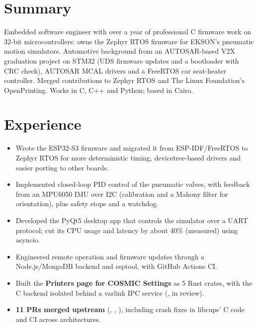 \documentclass[10pt]{article}
\begin{document}

\section*{Summary}
Embedded software engineer with over a year of professional C firmware work on 32-bit microcontrollers: owns the Zephyr RTOS firmware for EKSON's pneumatic motion simulators. Automotive background from an AUTOSAR-based V2X graduation project on STM32 (UDS firmware updates and a bootloader with CRC check), AUTOSAR MCAL drivers and a FreeRTOS car seat-heater controller. Merged contributions to Zephyr RTOS and The Linux Foundation's OpenPrinting. Works in C, C++ and Python; based in Cairo.

\section*{Experience}
\begin{itemize}
  \item Wrote the ESP32-S3 firmware and migrated it from ESP-IDF/FreeRTOS to Zephyr RTOS for more deterministic timing, devicetree-based drivers and easier porting to other boards.
  \item Implemented closed-loop PID control of the pneumatic valves, with feedback from an MPU6050 IMU over I2C (calibration and a Mahony filter for orientation), plus safety stops and a watchdog.
  \item Developed the PyQt5 desktop app that controls the simulator over a UART protocol; cut its CPU usage and latency by about 40\% (measured) using asyncio.
  \item Engineered remote operation and firmware updates through a Node.js/MongoDB backend and esptool, with GitHub Actions CI.
\end{itemize}
\begin{itemize}
  \item Built the \textbf{Printers page for COSMIC Settings} as 5 Rust crates, with the C backend isolated behind a varlink IPC service (, in review).
  \item \textbf{11 PRs merged upstream} (, , ), including crash fixes in libcups' C code and CI across architectures.
\end{itemize}
\end{document}
